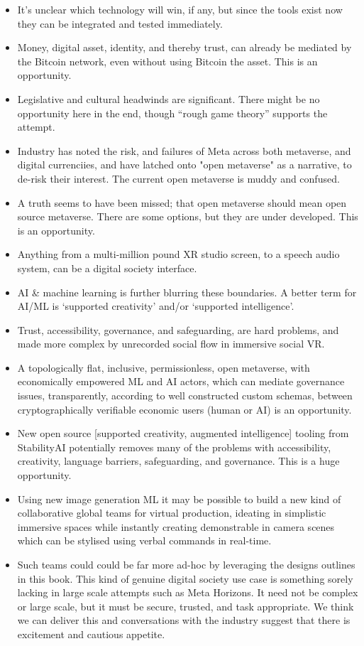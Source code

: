 \begin{itemize}
\item It's unclear which technology will win, if any, but since the tools exist now they can be integrated and tested immediately.
\item Money, digital asset, identity, and thereby trust, can already be mediated by the Bitcoin network, even without using Bitcoin the asset. This is an opportunity.
\item Legislative and cultural headwinds are significant. There might be no opportunity here in the end, though ``rough game theory'' supports the attempt.
\item Industry has noted the risk, and failures of Meta across both metaverse, and digital currenciies, and have latched onto "open metaverse" as a narrative, to de-risk their interest. The current open metaverse is muddy and confused. 
\item A truth seems to have been missed; that open metaverse should mean open source metaverse. There are some options, but they are under developed. This is an opportunity.
\item Anything from a multi-million pound XR studio screen, to a speech audio system, can be a digital society interface.
\item AI \& machine learning is further blurring these boundaries. A better term for AI/ML is `supported creativity' and/or `supported intelligence'.
\item Trust, accessibility, governance, and safeguarding, are hard problems, and made more complex by unrecorded social flow in immersive social VR.
\item A topologically flat, inclusive, permissionless, open metaverse, with economically empowered ML and AI actors, which can mediate governance issues, transparently, according to well constructed custom schemas, between cryptographically verifiable economic users (human or AI) is an opportunity.
\item New open source [supported creativity, augmented intelligence] tooling from StabilityAI potentially removes many of the problems with accessibility, creativity, language barriers, safeguarding, and governance. This is a huge opportunity.
\item Using new image generation ML it may be possible to build a new kind of collaborative global teams for virtual production, ideating in simplistic immersive spaces while instantly creating demonstrable in camera scenes which can be stylised using verbal commands in real-time.
\item Such teams could could be far more ad-hoc by leveraging the designs outlines in this book. This kind of genuine digital society use case is something sorely lacking in large scale attempts such as Meta Horizons. It need not be complex or large scale, but it must be secure, trusted, and task appropriate. We think we can deliver this and conversations with the industry suggest that there is excitement and cautious appetite. 
\end{itemize}

